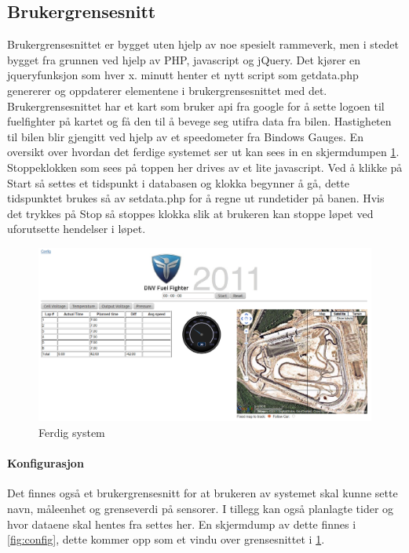\subsection{Brukergrensesnitt}
Brukergrensesnittet er bygget uten hjelp av noe spesielt rammeverk, men i stedet bygget fra grunnen ved hjelp av PHP, javascript og jQuery\cite{jquery}. Det kjører en jqueryfunksjon som hver x. minutt henter et nytt script som getdata.php genererer og oppdaterer elementene i brukergrensesnittet med det. Brukergrensesnittet har et kart som bruker api fra google for å sette logoen til fuelfighter på kartet og få den til å bevege seg utifra data fra bilen. Hastigheten til bilen blir gjengitt ved hjelp av et speedometer fra Bindows Gauges\cite{bindows}. En oversikt over hvordan det ferdige systemet ser ut kan sees in en skjermdumpen \ref{fig:gui}. Stoppeklokken som sees på toppen her drives av et lite javascript. Ved å klikke på Start så settes et tidspunkt i databasen og klokka begynner å gå, dette tidspunktet brukes så av setdata.php for å regne ut rundetider på banen. Hvis det trykkes på Stop så stoppes klokka slik at brukeren kan stoppe løpet ved uforutsette hendelser i løpet.

\begin{figure}[H]
\includegraphics[width=\textwidth]{images/gui.png}
\caption{Ferdig system} 
\label{fig:gui}
\end{figure}

\paragraph{Konfigurasjon}
Det finnes også et brukergrensesnitt for at brukeren av systemet skal kunne sette navn, måleenhet og grenseverdi på sensorer. I tillegg kan også planlagte tider og hvor dataene skal hentes fra settes her.
En skjermdump av dette finnes i \ref{fig:config}, dette kommer opp som et vindu over grensesnittet i \ref{fig:gui}.


